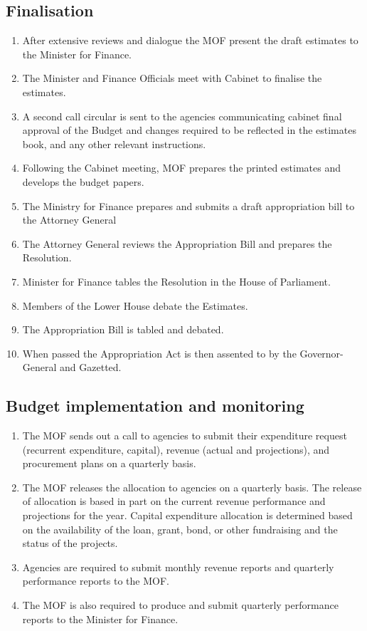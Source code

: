 \documentclass[
  10pt,
]{book}
\begin{document}
\hypertarget{finalisation-1}{%
\subsection{Finalisation}\label{finalisation-1}}

\begin{enumerate}
\def\labelenumi{\arabic{enumi}.}
\setcounter{enumi}{7}
\item
  After extensive reviews and dialogue the MOF present the draft estimates to the Minister for Finance.
\item
  The Minister and Finance Officials meet with Cabinet to finalise the estimates.
\item
  A second call circular is sent to the agencies communicating cabinet final approval of the Budget and changes required to be reflected in the estimates book, and any other relevant instructions.
\item
  Following the Cabinet meeting, MOF prepares the printed estimates and develops the budget papers.
\item
  The Ministry for Finance prepares and submits a draft appropriation bill to the Attorney General
\item
  The Attorney General reviews the Appropriation Bill and prepares the Resolution.
\item
  Minister for Finance tables the Resolution in the House of Parliament.
\item
  Members of the Lower House debate the Estimates.
\item
  The Appropriation Bill is tabled and debated.
\item
  When passed the Appropriation Act is then assented to by the Governor-General and Gazetted.
\end{enumerate}

\hypertarget{budget-implementation-and-monitoring-1}{%
\subsection{Budget implementation and monitoring}\label{budget-implementation-and-monitoring-1}}

\begin{enumerate}
\def\labelenumi{\arabic{enumi}.}
\setcounter{enumi}{17}
\item
  The MOF sends out a call to agencies to submit their expenditure request (recurrent expenditure, capital), revenue (actual and projections), and procurement plans on a quarterly basis.
\item
  The MOF releases the allocation to agencies on a quarterly basis. The release of allocation is based in part on the current revenue performance and projections for the year. Capital expenditure allocation is determined based on the availability of the loan, grant, bond, or other fundraising and the status of the projects.
\item
  Agencies are required to submit monthly revenue reports and quarterly performance reports to the MOF.
\item
  The MOF is also required to produce and submit quarterly performance reports to the Minister for Finance.
\end{enumerate}
\end{document}
